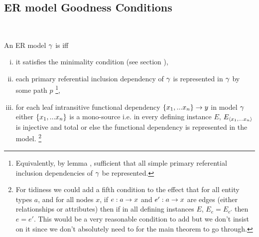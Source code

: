 \subsection{ER model Goodness Conditions}\
\begin{definition}
\noindent An ER model $\gamma$ is  
 iff 
\begin{enumerate} [(i)]
\item{
it satisfies the minimality condition (see section ),
}
\item{ 
each primary referential inclusion dependency of $\gamma$ is represented in $\gamma$ by some path $p$ \footnote{Equivalently, by lemma
\lref{simplerepresentationlemma}, sufficient that all simple primary referential inclusion dependencies of $\gamma$ be represented.},
}
\item{
for each leaf intransitive functional dependency $\left\{x_1,...x_n\right\} \rightarrow y$ in model $\gamma$
either $\left\{x_1,...x_n\right\}$ is a mono-source i.e. in every defining instance $E$, $E_{\langle x_1,...x_n\rangle}$ is injective and total
or else the functional dependency is represented in the model.
}\footnote{For tidiness we could add a fifth condition to the effect that for all entity types $a$, and for all nodes $x$, if $e:a \rightarrow x$ and $e': a \rightarrow x$ are edges (either relationships or attributes) then if in all defining instances $E$, $E_e=E_{e'}$ then $e = e'$. This would be a very reasonable condition to add but we don't insist on it since we don't absolutely need to for the main theorem to go through.}
\end{enumerate}
\end{definition}


